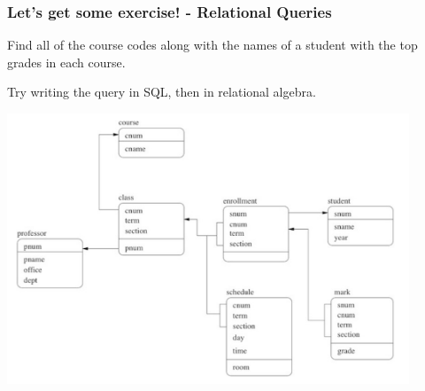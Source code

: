 \begin{frame}
\frametitle{Let's get some exercise! - Relational Queries}

Find all of the course codes along with the names of a student with the top grades in each course.

Try writing the query in SQL, then in relational algebra.

\begin{center}
  \includegraphics[width=0.9\textwidth]{images/db-schema.png}
\end{center}

\end{frame}

